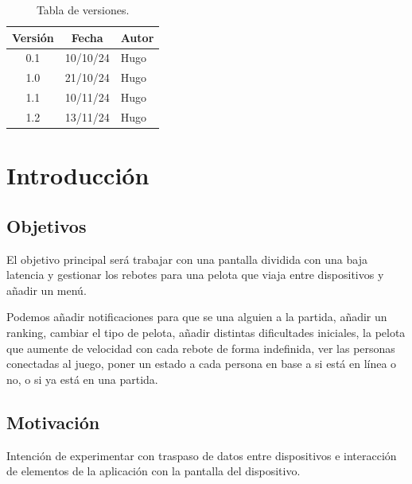 \documentclass[a4paper,openright,12pt]{article}
\begin{document}

\tableofcontents

\vspace{5cm}

\begin{flushright}
\begin{table}[hbtp]
\begin{center}

\caption{Tabla de versiones.}
\label{tabla:versiones}
\small
\vspace{1ex}

\begin{tabular}{|c|c|l|}
\hline
Versión & Fecha & Autor \\
\hline \hline
0.1 & 10/10/24 & Hugo\\ \hline
1.0 & 21/10/24 & Hugo\\ \hline
1.1 & 10/11/24 & Hugo\\ \hline
1.2 & 13/11/24 & Hugo\\ \hline

\end{tabular}

\end{center}
\end{table}
\end{flushright}

\newpage
{}


\section{Introducción}\label{cap.introduccion}

\subsection{Objetivos}
El objetivo principal será trabajar con una pantalla dividida con una baja latencia y gestionar los rebotes para una pelota que viaja entre dispositivos y añadir un menú.

Podemos añadir notificaciones para que se una alguien a la partida, añadir un ranking, cambiar el tipo de pelota, añadir distintas dificultades iniciales, la pelota que aumente de velocidad con cada rebote de forma indefinida, ver las personas conectadas al juego, poner un estado a cada persona en base a si está en línea o no, o si ya está en una partida.
\subsection{Motivación}
Intención de experimentar con traspaso de datos entre dispositivos e interacción de elementos de la aplicación con la pantalla del dispositivo.
\end{document}
